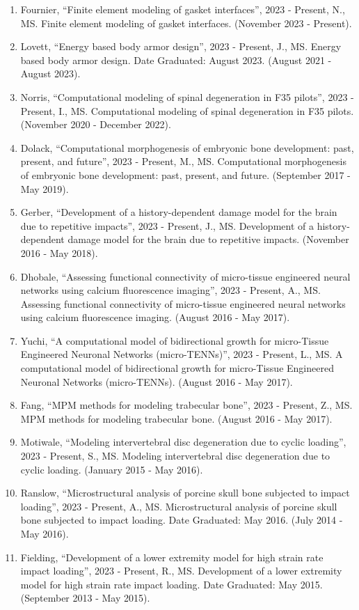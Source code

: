 \documentclass[11pt]{article}
\begin{document}
\begin{enumerate}
\def\labelenumi{\arabic{enumi}.}
\item Fournier, ``Finite element modeling of gasket interfaces'', 2023 - Present, N.,
 MS. 
Finite element modeling of gasket interfaces. 
(November 2023 - Present).
\item Lovett, ``Energy based body armor design'', 2023 - Present, J.,
 MS. 
Energy based body armor design. 
Date Graduated: August 2023. 
(August 2021 - August 2023).
\item Norris, ``Computational modeling of spinal degeneration in F35 pilots'', 2023 - Present, I., 
MS. 
Computational modeling of spinal degeneration in F35 pilots. 
(November 2020 - December 2022).
\item Dolack, ``Computational morphogenesis of embryonic bone development: past, present, and future'', 2023 - Present, M.,
 MS. 
Computational morphogenesis of embryonic bone development: past, present, and future. 
(September 2017 - May 2019).
\item Gerber, ``Development of a history-dependent damage model for the brain due to repetitive impacts'', 2023 - Present, J., 
MS. 
Development of a history-dependent damage model for the brain due to repetitive impacts. 
(November 2016 - May 2018).
\item Dhobale, ``Assessing functional connectivity of micro-tissue engineered neural networks using calcium fluorescence imaging'', 2023 - Present, A.,
 MS. 
Assessing functional connectivity of micro-tissue engineered neural networks using calcium fluorescence imaging. 
(August 2016 - May 2017).
\item Yuchi, ``A computational model of bidirectional growth for micro-Tissue Engineered Neuronal Networks (micro-TENNs)'', 2023 - Present, L.,
 MS. 
A computational model of bidirectional growth for micro-Tissue Engineered Neuronal Networks (micro-TENNs). 
(August 2016 - May 2017).
\item Fang, ``MPM methods for modeling trabecular bone'', 2023 - Present, Z.,
 MS. 
MPM methods for modeling trabecular bone. 
(August 2016 - May 2017).
\item Motiwale, ``Modeling intervertebral disc degeneration due to cyclic loading'', 2023 - Present, S.,
 MS. 
Modeling intervertebral disc degeneration due to cyclic loading. 
(January 2015 - May 2016).
\item Ranslow, ``Microstructural analysis of porcine skull bone subjected to impact loading'', 2023 - Present, A.,
 MS. 
Microstructural analysis of porcine skull bone subjected to impact loading. 
Date Graduated: May 2016. 
(July 2014 - May 2016).
\item Fielding, ``Development of a lower extremity model for high strain rate impact loading'', 2023 - Present, R.,
 MS. 
Development of a lower extremity model for high strain rate impact loading. 
Date Graduated: May 2015. 
(September 2013 - May 2015).
\end{enumerate}
\end{document}
